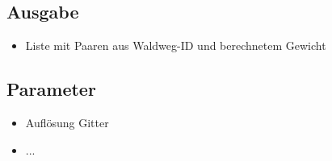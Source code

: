 \documentclass[parskip=half,german]{scrartcl}
\begin{document}
    
\subsection*{Ausgabe}
     \begin{itemize}
      \item Liste mit Paaren aus Waldweg-ID und berechnetem Gewicht
     \end{itemize}


    
\subsection*{Parameter}
\begin{itemize}
 \item Auflösung Gitter
 \item ...
\end{itemize}
      
      
  
\end{document}
